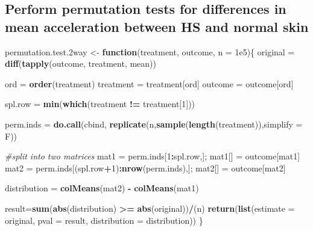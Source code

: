 \documentclass[]{article}
\newenvironment{Shaded}{\begin{snugshade}}{\end{snugshade}}
\newcommand{\KeywordTok}[1]{\textcolor[rgb]{0.13,0.29,0.53}{\textbf{#1}}}
\newcommand{\DataTypeTok}[1]{\textcolor[rgb]{0.13,0.29,0.53}{#1}}
\newcommand{\DecValTok}[1]{\textcolor[rgb]{0.00,0.00,0.81}{#1}}
\newcommand{\FloatTok}[1]{\textcolor[rgb]{0.00,0.00,0.81}{#1}}
\newcommand{\StringTok}[1]{\textcolor[rgb]{0.31,0.60,0.02}{#1}}
\newcommand{\CommentTok}[1]{\textcolor[rgb]{0.56,0.35,0.01}{\textit{#1}}}
\newcommand{\ControlFlowTok}[1]{\textcolor[rgb]{0.13,0.29,0.53}{\textbf{#1}}}
\newcommand{\OperatorTok}[1]{\textcolor[rgb]{0.81,0.36,0.00}{\textbf{#1}}}
\newcommand{\NormalTok}[1]{#1}
\begin{document}
\subsection{Perform permutation tests for differences in mean
acceleration between HS and normal
skin}\label{perform-permutation-tests-for-differences-in-mean-acceleration-between-hs-and-normal-skin}

\begin{Shaded}
\begin{Highlighting}[]
\NormalTok{permutation.test.2way <-}\StringTok{ }\ControlFlowTok{function}\NormalTok{(treatment, outcome, }\DataTypeTok{n =} \FloatTok{1e5}\NormalTok{)\{}
\NormalTok{  original =}\StringTok{ }\KeywordTok{diff}\NormalTok{(}\KeywordTok{tapply}\NormalTok{(outcome, treatment, mean))}
  
\NormalTok{  ord =}\StringTok{ }\KeywordTok{order}\NormalTok{(treatment)}
\NormalTok{  treatment =}\StringTok{ }\NormalTok{treatment[ord]}
\NormalTok{  outcome =}\StringTok{ }\NormalTok{outcome[ord]}
  
\NormalTok{  spl.row =}\StringTok{ }\KeywordTok{min}\NormalTok{(}\KeywordTok{which}\NormalTok{(treatment }\OperatorTok{!=}\StringTok{ }\NormalTok{treatment[}\DecValTok{1}\NormalTok{]))}
  
\NormalTok{  perm.inds =}\StringTok{ }\KeywordTok{do.call}\NormalTok{(cbind, }\KeywordTok{replicate}\NormalTok{(n,}\KeywordTok{sample}\NormalTok{(}\KeywordTok{length}\NormalTok{(treatment)),}\DataTypeTok{simplify =}\NormalTok{ F))}
  
  \CommentTok{#split into two matrices}
\NormalTok{  mat1 =}\StringTok{ }\NormalTok{perm.inds[}\DecValTok{1}\OperatorTok{:}\NormalTok{spl.row,]; mat1[] =}\StringTok{ }\NormalTok{outcome[mat1]}
\NormalTok{  mat2 =}\StringTok{ }\NormalTok{perm.inds[(spl.row}\OperatorTok{+}\DecValTok{1}\NormalTok{)}\OperatorTok{:}\KeywordTok{nrow}\NormalTok{(perm.inds),]; mat2[] =}\StringTok{ }\NormalTok{outcome[mat2]}
  
\NormalTok{  distribution =}\StringTok{ }\KeywordTok{colMeans}\NormalTok{(mat2) }\OperatorTok{-}\StringTok{ }\KeywordTok{colMeans}\NormalTok{(mat1)}
  
\NormalTok{  result=}\KeywordTok{sum}\NormalTok{(}\KeywordTok{abs}\NormalTok{(distribution) }\OperatorTok{>=}\StringTok{ }\KeywordTok{abs}\NormalTok{(original))}\OperatorTok{/}\NormalTok{(n)}
  \KeywordTok{return}\NormalTok{(}\KeywordTok{list}\NormalTok{(}\DataTypeTok{estimate =}\NormalTok{ original, }\DataTypeTok{pval =}\NormalTok{ result, }\DataTypeTok{distribution =}\NormalTok{ distribution))}
\NormalTok{\}}


\end{Highlighting}
\end{Shaded}
\end{document}

